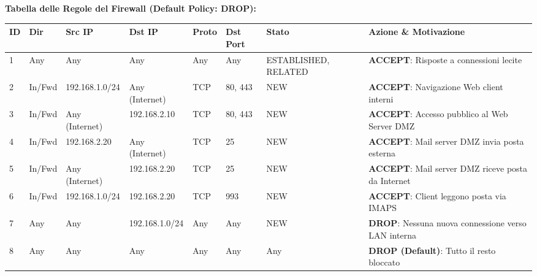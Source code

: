 \documentclass[11pt,a4paper]{article}
\begin{document}
\begin{solutionbox}
\textbf{Tabella delle Regole del Firewall (Default Policy: DROP):}
\begin{center}
\small
\begin{tabularx}{\textwidth}{lllllllX}
\toprule
\textbf{ID} & \textbf{Dir} & \textbf{Src IP} & \textbf{Dst IP} & \textbf{Proto} & \textbf{Dst Port} & \textbf{Stato} & \textbf{Azione \& Motivazione} \\
\midrule
1 & Any & Any & Any & Any & Any & ESTABLISHED, RELATED & \textbf{ACCEPT}: Risposte a connessioni lecite \\
2 & In/Fwd & 192.168.1.0/24 & Any (Internet) & TCP & 80, 443 & NEW & \textbf{ACCEPT}: Navigazione Web client interni \\
3 & In/Fwd & Any (Internet) & 192.168.2.10 & TCP & 80, 443 & NEW & \textbf{ACCEPT}: Accesso pubblico al Web Server DMZ \\
4 & In/Fwd & 192.168.2.20 & Any (Internet) & TCP & 25 & NEW & \textbf{ACCEPT}: Mail server DMZ invia posta esterna \\
5 & In/Fwd & Any (Internet) & 192.168.2.20 & TCP & 25 & NEW & \textbf{ACCEPT}: Mail server DMZ riceve posta da Internet \\
6 & In/Fwd & 192.168.1.0/24 & 192.168.2.20 & TCP & 993 & NEW & \textbf{ACCEPT}: Client leggono posta via IMAPS \\
7 & Any & Any & 192.168.1.0/24 & Any & Any & NEW & \textbf{DROP}: Nessuna nuova connessione verso LAN interna \\
8 & Any & Any & Any & Any & Any & Any & \textbf{DROP (Default)}: Tutto il resto bloccato \\
\bottomrule
\end{tabularx}
\end{center}
\end{solutionbox}
\end{document}
